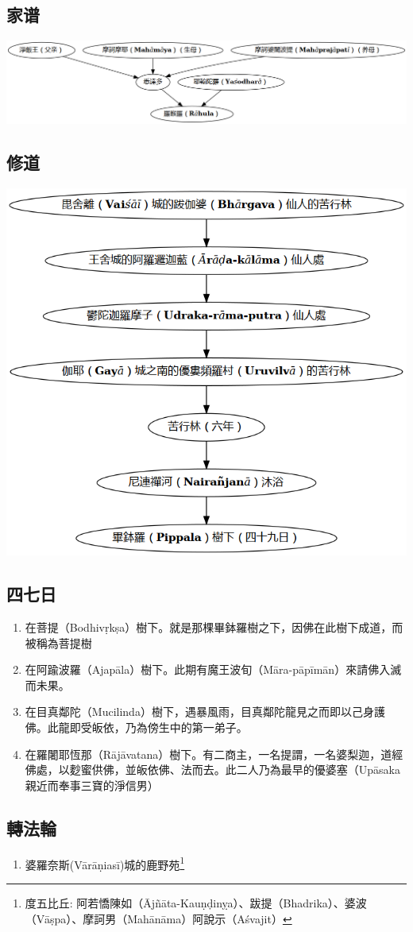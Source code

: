 \subsection{家谱}
\includegraphics[width=\textwidth]{释家/images/释尊家谱.png}

\subsection{修道}
\includegraphics[width=\textwidth]{释家/images/释尊修行地图.png}

\subsection{四七日}
\begin{enumerate}
  \item 在菩提（Bodhivṛkṣa）樹下。就是那棵畢鉢羅樹之下，因佛在此樹下成道，而被稱為菩提樹
  \item 在阿踰波羅（Ajapāla）樹下。此期有魔王波旬（Māra-pāpīmān）來請佛入滅而未果。
  \item 在目真鄰陀（Mucilinda）樹下，遇暴風雨，目真鄰陀龍見之而即以己身護佛。此龍即受皈依，乃為傍生中的第一弟子。
  \item 在羅闍耶恆那（Rājāvatana）樹下。有二商主，一名提謂，一名婆梨迦，道經佛處，以麨蜜供佛，並皈依佛、法而去。此二人乃為最早的優婆塞（Upāsaka 親近而奉事三寶的淨信男）
\end{enumerate}

\subsection{轉法輪}
\begin{enumerate}
  \item 婆羅奈斯(Vārāṇiasī)城的鹿野苑\footnote{度五比丘: 阿若憍陳如（Ājñāta-Kauṇḍinỵa）、跋提（Bhadrika）、婆波（Vāṣpa）、摩訶男（Mahānāma）阿說示（Aśvajit）} 
\end{enumerate}
